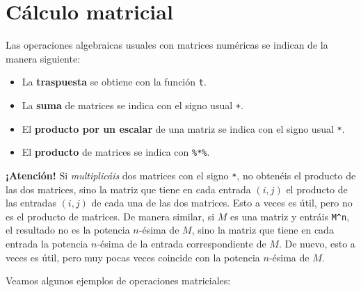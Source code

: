 \documentclass[
]{book}
\theoremstyle{definition}
\theoremstyle{definition}
\theoremstyle{definition}
\theoremstyle{remark}
\begin{document}
\hypertarget{cuxe1lculo-matricial}{%
\section{Cálculo matricial}\label{cuxe1lculo-matricial}}

Las operaciones algebraicas usuales con matrices numéricas se indican de la manera siguiente:

\begin{itemize}
\item
  La \textbf{traspuesta} se obtiene con la función \texttt{t}.
\item
  La \textbf{suma} de matrices se indica con el signo usual \texttt{+}.
\item
  El \textbf{producto por un escalar} de una matriz se indica con el signo usual \texttt{*}.
\item
  El \textbf{producto} de matrices se indica con \texttt{\%*\%}.
\end{itemize}

\textbf{¡Atención!} Si \emph{multiplicáis} dos matrices con el signo \texttt{*}, no obtenéis el producto de las dos matrices, sino la matriz que tiene en cada entrada \((i, j)\) el producto de las entradas \((i, j)\) de cada una de las dos matrices. Esto a veces es útil, pero no es el producto de matrices. De manera similar, si \(M\) es una matriz y entráis \texttt{M\^{}n}, el resultado no es la potencia \(n\)-ésima de \(M\), sino la matriz que tiene en cada entrada la potencia \(n\)-ésima de la entrada correspondiente de \(M\). De nuevo, esto a veces es útil, pero muy pocas veces coincide con la potencia \(n\)-ésima de \(M\).

Veamos algunos ejemplos de operaciones matriciales:
\end{document}
